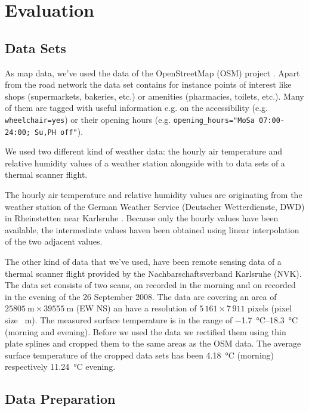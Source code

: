 
\section{Evaluation}

\subsection{Data Sets \label{sec:data-sets}}

As map data, we've used the data of the OpenStreetMap (OSM) project \parencite{OSMF2016}. Apart from the road network the data set contains for instance points of interest like shops (supermarkets, bakeries, etc.) or amenities (pharmacies,  toilets, etc.). Many of them are tagged with useful information e.g. on the accessibility (e.g. \verb|wheelchair=yes|) or their opening hours (e.g. \verb|opening_hours="MoSa 07:00-24:00; Su,PH off"|).

We used two different kind of weather data: the hourly air temperature and relative humidity values of a weather station alongside with to data sets of a thermal scanner flight.  

The hourly air temperature and relative humidity values are originating from the weather station of the German Weather Service (Deutscher Wetterdienste, DWD) in Rheinstetten near Karlsruhe \parencite{DWD2016}. Because only the hourly values have been available, the intermediate values haven been obtained using linear interpolation of the two adjacent values.

The other kind of data that we've used, have been remote sensing data of a thermal scanner flight provided by the Nachbarschaftsverband Karlsruhe (NVK). The data set consists of two scans, on recorded in the morning and on recorded in the evening of the 26 September 2008. The data are covering an area of  $\SI{25 805}{\meter} \times \SI{39 555}{\meter}$ (EW NS) an have a resolution of $5\,161 \times 7\,911$  pixels (pixel size \SI{}{\meter}). The measured surface temperature is in the range of \SIrange{-1.7}{18.3}{\celsius} (morning and evening). Before we used the data we rectified them using thin plate splines and cropped them to the same areas as the OSM data. The average surface temperature of the cropped data sets has been \SI{4.18}{\celsius} (morning) respectively \SI{11.24}{\celsius} evening.  


\subsection{Data Preparation}

